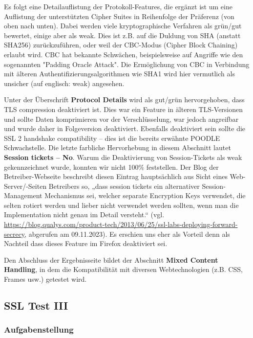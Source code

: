 \documentclass{article}
\begin{document}
Es folgt eine Detailauflistung der Protokoll-Features, die ergänzt ist um eine Auflistung der 
unterstützten Cipher Suites in Reihenfolge der Präferenz (von oben nach unten). Dabei werden viele 
kryptographische Verfahren als grün/gut bewertet, einige aber als weak. Dies ist z.B. auf die Duldung 
von SHA (anstatt SHA256) zurückzuführen, oder weil der CBC-Modus (Cipher Block Chaining) erlaubt wird. 
CBC hat bekannte Schwächen, beispielsweise auf Angriffe wie den sogenannten "Padding Oracle Attack".
Die Ermöglichung von CBC in Verbindung mit älteren Authentifizierungsalgorithmen wie SHA1 wird hier 
vermutlich als unsicher (auf englisch: weak) angesehen.

Unter der Überschrift \textbf{Protocol Details} wird als gut/grün hervorgehoben, dass TLS compression 
deaktiviert ist. Dies war ein Feature in älteren TLS-Versionen und sollte Daten komprimieren vor der 
Verschlüsselung, war jedoch angreifbar und wurde daher in Folgeversion deaktiviert. Ebenfalls 
deaktiviert sein sollte die SSL 2 handshake compatibility – dies ist die bereits erwähnte POODLE 
Schwachstelle. Die letzte farbliche Hervorhebung in diesem Abschnitt lautet \textbf{Session tickets – 
No}. Warum die Deaktivierung von Session-Tickets als weak gekennzeichnet wurde, konnten wir nicht 100\% 
feststellen. Der Blog der Betreiber-Webseite beschreibt diesen Eintrag hauptsächlich aus Sicht eines 
Web-Server/-Seiten Betreibers so, „dass session tickets ein alternativer Session-Management Mechanismus 
sei, welcher separate Encryption Keys verwendet, die selten rotiert werden und lieber nicht verwendet 
werden sollten, wenn man die Implementation nicht genau im Detail versteht.“ (vgl.
\url{https://blog.qualys.com/product-tech/2013/06/25/ssl-labs-deploying-forward-secrecy}, abgerufen am 
09.11.2023). Es erschien uns eher als Vorteil denn als Nachteil dass dieses Feature im Firefox 
deaktiviert sei.

Den Abschluss der Ergebnisseite bildet der Abschnitt \textbf{Mixed Content Handling}, in dem die 
Kompatibilität mit diversen Webtechnologien (z.B. CSS, Frames usw.) getestet wird.

\newpage

\subsection{SSL Test III}

\subsubsection*{Aufgabenstellung}
\end{document}
